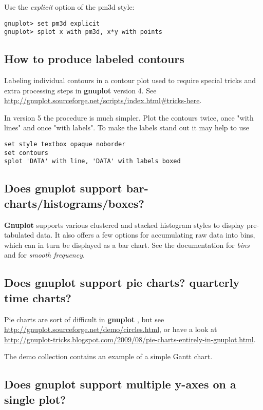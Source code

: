 \documentclass[a4paper,11pt]{article}
\def\http#1{{\small\href{http://#1}{\url{http://#1}}}}
\newcommand{\http}[1]%
            {\htmladdnormallink{\latex{\url{http://#1}}%
                    \html{\textit{http://#1}}}%
                {http://#1}%
            }
\newcommand{\gnuplot}{\textbf{gnuplot }}
\newcommand{\Gnuplot}{\textbf{Gnuplot }}
\begin{document}
Use the {\em explicit} option of the pm3d style:
\small
\begin{verbatim}
gnuplot> set pm3d explicit
gnuplot> splot x with pm3d, x*y with points
\end{verbatim}
\normalsize


\subsection{How to produce labeled contours}

Labeling individual contours in a contour plot used to require special
tricks and extra processing steps in \gnuplot version 4.
See
\http{gnuplot.sourceforge.net/scripts/index.html\#tricks-here}.

In version 5 the procedure is much simpler.  Plot the contours twice,
once "with lines" and once "with labels".  To make the labels stand out
it may help to use 
\begin{verbatim}
set style textbox opaque noborder
set contours
splot 'DATA' with line, 'DATA' with labels boxed
\end{verbatim}

\subsection{Does \gnuplot support bar-charts/histograms/boxes?}

\Gnuplot{} supports various clustered and stacked histogram styles to display
pre-tabulated data.  It also offers a few options for accumulating raw data
into bins, which can in turn be displayed as a bar chart.  See the documentation
for \textit{bins} and for \textit{smooth frequency}.

\subsection{Does \gnuplot support pie charts? quarterly time charts?}

Pie charts are sort of difficult in \gnuplot, but see
\http{gnuplot.sourceforge.net/demo/circles.html}, 
or have a look at
\http{gnuplot-tricks.blogspot.com/2009/08/pie-charts-entirely-in-gnuplot.html}.

The demo collection contains an example of a simple Gantt chart.

\subsection{Does \gnuplot support multiple y-axes on a single plot?}
\end{document}

